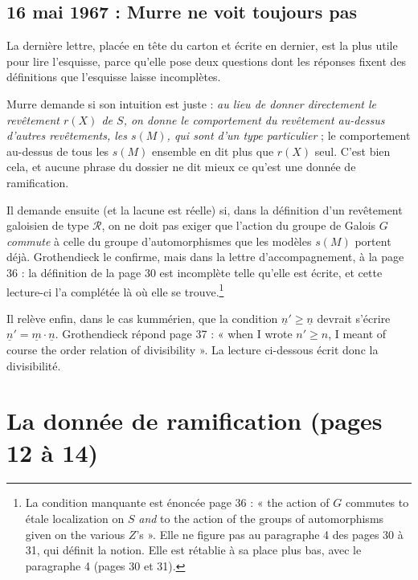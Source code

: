 \documentclass[11pt,a4paper]{article}
\begin{document}
\subsection*{16 mai 1967 : Murre ne voit toujours pas}

La dernière lettre, placée en tête du carton et écrite en dernier, est la
plus utile pour lire l'esquisse, parce qu'elle pose deux questions dont les
réponses fixent des définitions que l'esquisse laisse incomplètes.

Murre demande si son intuition est juste : \emph{au lieu de donner directement
le revêtement $r(X)$ de $S$, on donne le comportement du revêtement au-dessus
d'autres revêtements, les $s(M)$, qui sont d'un type particulier} ; le
comportement au-dessus de tous les $s(M)$ ensemble en dit plus que $r(X)$
seul. C'est bien cela, et aucune phrase du dossier ne dit mieux ce qu'est une
donnée de ramification.

Il demande ensuite (et la lacune est réelle) si, dans la définition
d'un revêtement galoisien de type $\mathcal{R}$, on ne doit pas exiger que
l'action du groupe de Galois $G$ \emph{commute} à celle du groupe
d'automorphismes que les modèles $s(M)$ portent déjà. Grothendieck le confirme,
mais dans la lettre d'accompagnement, à la page 36 : la définition de la page
30 est incomplète telle qu'elle est écrite, et cette lecture-ci l'a complétée
là où elle se trouve.\footnote{La condition manquante est énoncée page 36 :
« the action of $G$ commutes to étale localization on $S$ \emph{and} to the
action of the groups of automorphisms given on the various $Z$'s ». Elle ne
figure pas au paragraphe 4 des pages 30 à 31, qui définit la notion. Elle est rétablie à sa place plus bas, avec le paragraphe 4 (pages 30 et 31).}

Il relève enfin, dans le cas kummérien, que la condition
$\underline{n}' \geqslant \underline{n}$ devrait s'écrire
$\underline{n}' = \underline{m} \cdot \underline{n}$. Grothendieck répond page
37 : « when I wrote $n' \geqslant n$, I meant of course the order relation of
divisibility ». La lecture ci-dessous écrit donc la divisibilité.

\section*{La donnée de ramification (pages 12 à 14)}
\end{document}
